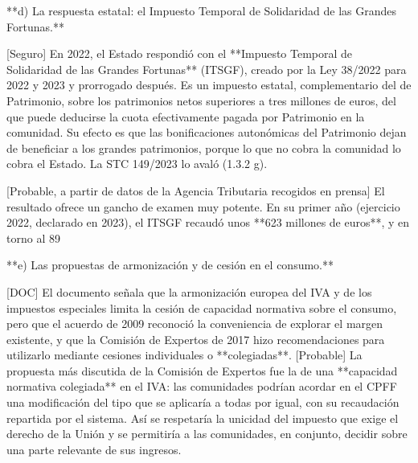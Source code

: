 \documentclass[10pt,a4paper]{article}
\begin{document}
**d) La respuesta estatal: el Impuesto Temporal de Solidaridad de las Grandes Fortunas.**

[Seguro] En 2022, el Estado respondió con el **Impuesto Temporal de Solidaridad de las Grandes Fortunas** (ITSGF), creado por la Ley 38/2022 para 2022 y 2023 y prorrogado después. Es un impuesto estatal, complementario del de Patrimonio, sobre los patrimonios netos superiores a tres millones de euros, del que puede deducirse la cuota efectivamente pagada por Patrimonio en la comunidad. Su efecto es que las bonificaciones autonómicas del Patrimonio dejan de beneficiar a los grandes patrimonios, porque lo que no cobra la comunidad lo cobra el Estado. La STC 149/2023 lo avaló (1.3.2 g).

[Probable, a partir de datos de la Agencia Tributaria recogidos en prensa] El resultado ofrece un gancho de examen muy potente. En su primer año (ejercicio 2022, declarado en 2023), el ITSGF recaudó unos **623 millones de euros**, y en torno al 89%

**e) Las propuestas de armonización y de cesión en el consumo.**

[DOC] El documento señala que la armonización europea del IVA y de los impuestos especiales limita la cesión de capacidad normativa sobre el consumo, pero que el acuerdo de 2009 reconoció la conveniencia de explorar el margen existente, y que la Comisión de Expertos de 2017 hizo recomendaciones para utilizarlo mediante cesiones individuales o **colegiadas**. [Probable] La propuesta más discutida de la Comisión de Expertos fue la de una **capacidad normativa colegiada** en el IVA: las comunidades podrían acordar en el CPFF una modificación del tipo que se aplicaría a todas por igual, con su recaudación repartida por el sistema. Así se respetaría la unicidad del impuesto que exige el derecho de la Unión y se permitiría a las comunidades, en conjunto, decidir sobre una parte relevante de sus ingresos.
\end{document}
